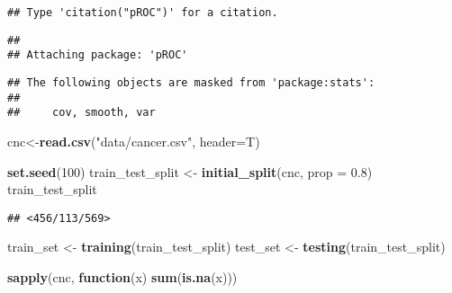\documentclass[]{article}
\newenvironment{Shaded}{\begin{snugshade}}{\end{snugshade}}
\newcommand{\ControlFlowTok}[1]{\textcolor[rgb]{0.13,0.29,0.53}{\textbf{#1}}}
\newcommand{\DataTypeTok}[1]{\textcolor[rgb]{0.13,0.29,0.53}{#1}}
\newcommand{\DecValTok}[1]{\textcolor[rgb]{0.00,0.00,0.81}{#1}}
\newcommand{\FloatTok}[1]{\textcolor[rgb]{0.00,0.00,0.81}{#1}}
\newcommand{\KeywordTok}[1]{\textcolor[rgb]{0.13,0.29,0.53}{\textbf{#1}}}
\newcommand{\NormalTok}[1]{#1}
\newcommand{\StringTok}[1]{\textcolor[rgb]{0.31,0.60,0.02}{#1}}
\begin{document}
\begin{verbatim}
## Type 'citation("pROC")' for a citation.
\end{verbatim}

\begin{verbatim}
## 
## Attaching package: 'pROC'
\end{verbatim}

\begin{verbatim}
## The following objects are masked from 'package:stats':
## 
##     cov, smooth, var
\end{verbatim}

\begin{Shaded}
\begin{Highlighting}[]
\NormalTok{cnc<-}\KeywordTok{read.csv}\NormalTok{(}\StringTok{"data/cancer.csv"}\NormalTok{, }\DataTypeTok{header=}\NormalTok{T)}
\end{Highlighting}
\end{Shaded}

\begin{Shaded}
\begin{Highlighting}[]
\KeywordTok{set.seed}\NormalTok{(}\DecValTok{100}\NormalTok{)}
\NormalTok{train_test_split <-}\StringTok{ }\KeywordTok{initial_split}\NormalTok{(cnc, }\DataTypeTok{prop =} \FloatTok{0.8}\NormalTok{)}
\NormalTok{train_test_split}
\end{Highlighting}
\end{Shaded}

\begin{verbatim}
## <456/113/569>
\end{verbatim}

\begin{Shaded}
\begin{Highlighting}[]
\NormalTok{train_set <-}\StringTok{ }\KeywordTok{training}\NormalTok{(train_test_split)}
\NormalTok{test_set <-}\StringTok{ }\KeywordTok{testing}\NormalTok{(train_test_split)}
\end{Highlighting}
\end{Shaded}

\begin{Shaded}
\begin{Highlighting}[]
\KeywordTok{sapply}\NormalTok{(cnc, }\ControlFlowTok{function}\NormalTok{(x) }\KeywordTok{sum}\NormalTok{(}\KeywordTok{is.na}\NormalTok{(x)))}
\end{Highlighting}
\end{Shaded}
\end{document}
